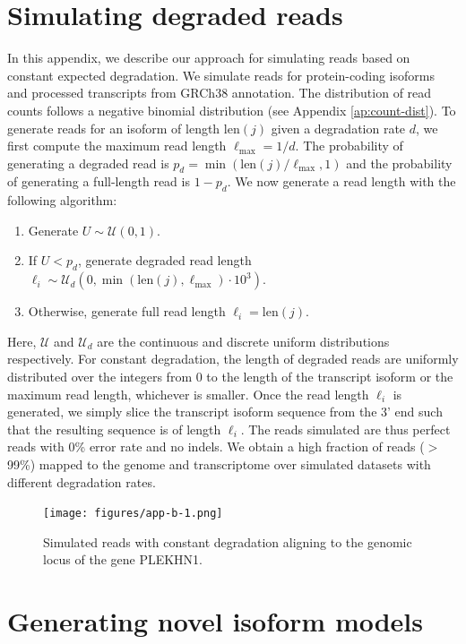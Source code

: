 
\chapter{Simulating degraded reads}\label{ap:sim-deg-reads}

In this appendix, we describe our approach for simulating reads based on constant expected degradation. We simulate reads for protein-coding isoforms and processed transcripts from GRCh38 annotation. The distribution of read counts follows a negative binomial distribution (see Appendix \ref{ap:count-dist}). To generate reads for an isoform of length $\mathrm{len}(j)$ given a degradation rate $d$, we first compute the maximum read length $\ell_\mathrm{max}=1/d$. The probability of generating a degraded read is $p_d=\min(\mathrm{len}(j)/\ell_\mathrm{max}, 1)$ and the probability of generating a full-length read is $1-p_d$. We now generate a read length with the following algorithm:
\begin{enumerate}
    \item Generate $U\sim \mathcal{U}(0,1)$.
    \item If $U<p_d$, generate degraded read length $\ell_i\sim \mathcal{U}_d(0,\min(\mathrm{len}(j),\ell_\mathrm{max})\cdot10^3)$.
    \item Otherwise, generate full read length $\ell_i=\mathrm{len}(j)$.
\end{enumerate}
Here, $\mathcal{U}$ and $\mathcal{U}_d$ are the continuous and discrete uniform distributions respectively. For constant degradation, the length of degraded reads are uniformly distributed over the integers from 0 to the length of the transcript isoform or the maximum read length, whichever is smaller. Once the read length $\ell_i$ is generated, we simply slice the transcript isoform sequence from the 3' end such that the resulting sequence is of length $\ell_i$. The reads simulated are thus perfect reads with 0\% error rate and no indels. We obtain a high fraction of reads ($>$99\%) mapped to the genome and transcriptome over simulated datasets with different degradation rates. 
\begin{figure}[H]
    \centering
    \texttt{[image: figures/app-b-1.png]}
    \caption[Simulated reads with constant degradation aligning to the genome.]{Simulated reads with constant degradation aligning to the genomic locus of the gene PLEKHN1.}
\label{fig:app-b-1}
\end{figure}

\chapter{Generating novel isoform models}\label{ap:gen-novl-iso}

